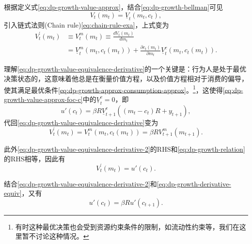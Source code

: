 根据定义式\eqref{eq:dp-growth-value-approx}，结合\eqref{eq:dp-growth-bellman}可见
\begin{equation}
  \label{eq:dp-growth-value-equivalence}
  V_{t} \left( m_{t} \right) = \underline{V}_{t} \left( m_{t}, c_{t} \right),
\end{equation}
引入链式法则(Chain rule)\eqref{eq:chain-rule-exa}，上式变为
\begin{equation}
  \label{eq:dp-growth-value-equivalence-derivative}
  \begin{split}
  V_{t}^{'} \left( m_{t} \right) & \equiv V_{t}^{m} \left( m_{t} \right) \equiv \frac{d V_{t} \left(m_{t} \right)}{d m_{t}} \\
  & = \underline{V}_{t}^{m} \left( m_{t}, c_{t} \left( m_{t} \right) \right)
  + \frac{\partial c_{t} \left( m_{t} \right)}{\partial m_{t}}
  \underline{V}_{t}^{c} \left(
  m_{t}, c_{t} \left( m_{t} \right)
  \right).
  \end{split}
\end{equation}

理解\eqref{eq:dp-growth-value-equivalence-derivative}的一个关键是：行为人是处于最优决策状态的，这意味着他总是在衡量价值方程，以及价值方程相对于消费的偏导，使其满足最优条件\eqref{eq:dp-growth-approx-consumption-approx}。\footnote{有时这种最优决策也会受到资源约束条件的限制，如流动性约束等，我们在这里暂不讨论这种情况。}，这使得\eqref{eq:dp-growth-value-approx-foc-c}中的$\underline{V}_{t}^{c} = 0$，即
\begin{equation}
  \label{eq:dp-growth-value-approx-foc-c-2}
  u'(c_{t}) = \beta R \underline{V}_{t+1}^{c}
  \left(
  \left(m_{t} - c_{t} \right) R + y_{t+1}
  \right),
\end{equation}
代回\eqref{eq:dp-growth-value-equivalence-derivative}变为
\begin{equation}
  \label{eq:dp-growth-value-equivalence-derivative-2}
  V_{t}^{'} \left( m_{t} \right)
  = V_{t}^{m} \left( m_{t}, c_{t} \left(m_{t} \right) \right) = \beta R V_{t+1}^{m} \left( m_{t+1} \right).
\end{equation}

此外\eqref{eq:dp-growth-value-equivalence-derivative-2}的RHS和\eqref{eq:dp-growth-relation}的RHS相等，因此有
\begin{equation}
  \label{eq:dp-growth-derivative-equiv}
  V_{t}^{'} \left( m_{t} \right) = u' \left( c_{t} \right).
\end{equation}

结合\eqref{eq:dp-growth-value-equivalence-derivative-2}和\eqref{eq:dp-growth-derivative-equiv}，又有
\begin{equation}
  \label{eq:dp-growth-euler}
  u' \left( c_{t} \right) = \beta R u' \left( c_{t+1} \right).
\end{equation}

